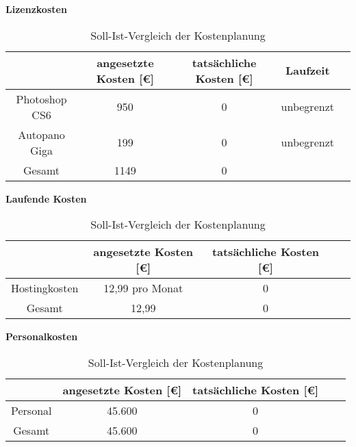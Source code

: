 \textbf{Lizenzkosten}

\begin{table}[h]
\centering
\begin{tabular}{ccccl}
\hline
\multicolumn{1}{l}{}      & angesetzte Kosten {[}€{]} & tatsächliche Kosten {[}€{]} &  Laufzeit \\ \hline
Photoshop CS6             & 950\footnotemark[7]       & 0                           &  unbegrenzt  \\ \hline
Autopano Giga             & 199\footnotemark[8]       & 0                           &  unbegrenzt  \\ \hline

Gesamt                    & 1149           & 0                    \\ \hline
\end{tabular}
\caption{Soll-Ist-Vergleich der Kostenplanung}%
\label{tab:KostenaufstellungLizenzen}%
\end{table}



\textbf{Laufende Kosten}

\begin{table}[h]
\centering
\begin{tabular}{ccccl}
\hline
\multicolumn{1}{l}{}      & angesetzte Kosten {[}€{]} & tatsächliche Kosten {[}€{]} \\ \hline
Hostingkosten             & 12,99 pro Monat\footnotemark[9]       & 0                    
\\ \hline

Gesamt                    & 12,99           & 0                    \\ \hline
\end{tabular}
\caption{Soll-Ist-Vergleich der Kostenplanung}%
\label{tab:KostenaufstellungLizenzen}%
\end{table}



\textbf{Personalkosten}

\begin{table}[h]
\centering
\begin{tabular}{ccccl}
\hline
\multicolumn{1}{l}{}      & angesetzte Kosten {[}€{]} & tatsächliche Kosten {[}€{]} \\ \hline
Personal                  & 45.600\footnotemark[10]    & 0                         \\ \hline

Gesamt                    & 45.600           & 0                    \\ \hline
\end{tabular}
\caption{Soll-Ist-Vergleich der Kostenplanung}%
\label{tab:KostenaufstellungLizenzen}%
\end{table}

